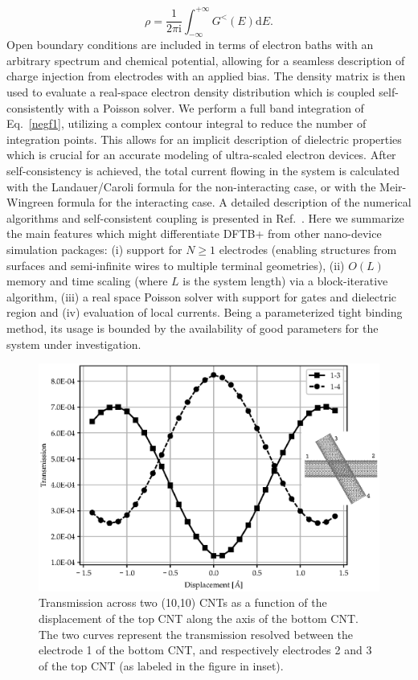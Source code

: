 \documentclass{revtex4-1}
\newcommand{\dftbp}{DFTB+}
\begin{document}
\begin{equation} \label{negf1}
  \rho = \frac{1}{2\pi \mathrm{i}} \int_{-\infty}^{+\infty} {G^{<}(E)
    \mathrm{d}E}.
\end{equation}
%
Open boundary conditions are included in terms of electron baths with an
arbitrary spectrum and chemical potential, allowing for a seamless description
of charge injection from electrodes with an applied bias. The density matrix is
then used to evaluate a real-space electron density distribution which is
coupled self-consistently with a Poisson solver.  We perform a full band
integration of Eq.~\ref{negf1}, utilizing a complex contour integral to reduce
the number of integration points.\cite{pecchia2004} This allows for an implicit
description of dielectric properties which is crucial for an accurate modeling
of ultra-scaled electron devices.\cite{markov2015,chu2018} After
self-consistency is achieved, the total current flowing in the system is
calculated with the Landauer/Caroli formula for the non-interacting case, or
with the Meir-Wingreen formula for the interacting case.\cite{haug2008} A
detailed description of the numerical algorithms and self-consistent coupling is
presented in Ref.~. Here we summarize the main features
which might differentiate \dftbp{} from other nano-device simulation packages:
(i) support for $N \geqslant 1$ electrodes (enabling structures from surfaces
and semi-infinite wires to multiple terminal geometries), (ii) $O(L)$
memory and time scaling (where $L$ is the system length) via a block-iterative
algorithm, (iii) a real space Poisson solver with support for gates and
dielectric region and (iv) evaluation of local currents.  Being a parameterized
tight binding method, its usage is bounded by the availability of good
parameters for the system under investigation.

\begin{figure}[htbp]
  \centering
  \includegraphics[scale=.75]{figures/dftb-negf1.eps}
  \caption{\label{fig:dftb_negf1} Transmission across two (10,10) CNTs as a
    function of the displacement of the top CNT along the axis of the bottom
    CNT. The two curves represent the transmission resolved between the
    electrode 1 of the bottom CNT, and respectively electrodes 2 and 3 of the
    top CNT (as labeled in the figure in inset).}
\end{figure}
\end{document}
